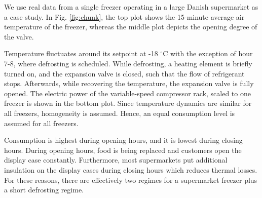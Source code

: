 
We use real data from a single freezer operating in a large Danish supermarket as a case study.
In Fig. \ref{fig:chunk}, the top plot shows the 15-minute average air temperature of the freezer, whereas the middle plot depicts the opening degree of the valve.

Temperature fluctuates around its setpoint at -18 $^{\circ}$C with the exception of hour 7-8, where defrosting is scheduled.
While defrosting, a heating element is briefly turned on, and the expansion valve is closed, such that the flow of refrigerant stops. Afterwards, while recovering the temperature, the expansion valve is fully opened.
The electric power of the variable-speed compressor rack, scaled to one freezer is shown in the bottom plot. Since temperature dynamics are similar for all freezers, homogeneity is assumed. Hence, an equal consumption level is assumed for all freezers.

Consumption is highest during opening hours, and it is lowest during closing hours.
During opening hours, food is being replaced and customers open the display case constantly.
Furthermore, most supermarkets put additional insulation on the display cases during closing hours which reduces thermal losses.
For these reasons, there are effectively two regimes for a supermarket freezer plus a short defrosting regime.

